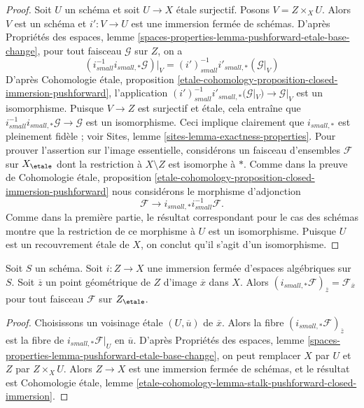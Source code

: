 \begin{proof}
Soit $U$ un schéma et soit $U \to X$ \'etale surjectif.
Posons $V = Z \times_X U$. Alors $V$ est un schéma et $i' : V \to U$ est
une immersion fermée de schémas. D'après
Propriétés des espaces,
lemme \ref{spaces-properties-lemma-pushforward-etale-base-change},
pour tout faisceau $\mathcal{G}$ sur $Z$, on a
$$
(i_{small}^{-1}i_{small, *}\mathcal{G})|_V =
(i')_{small}^{-1}i'_{small, *}(\mathcal{G}|_V)
$$
D'après
Cohomologie \'etale, proposition
\ref{etale-cohomology-proposition-closed-immersion-pushforward},
l'application
$(i')_{small}^{-1}i'_{small, *}(\mathcal{G}|_V) \to \mathcal{G}|_V$
est un isomorphisme. Puisque $V \to Z$ est surjectif et \'etale, cela entraîne
que $i_{small}^{-1}i_{small, *}\mathcal{G} \to \mathcal{G}$ est un
isomorphisme. Ceci implique clairement que $i_{small, *}$ est pleinement fidèle ; voir
Sites, lemme \ref{sites-lemma-exactness-properties}.
Pour prouver l'assertion sur l'image essentielle, considérons un faisceau d'ensembles
$\mathcal{F}$ sur $X_\etale$ dont la restriction à $X \setminus Z$ est
isomorphe à $*$. Comme dans la preuve de
Cohomologie \'etale, proposition
\ref{etale-cohomology-proposition-closed-immersion-pushforward}
nous considérons le morphisme d'adjonction
$$
\mathcal{F} \longrightarrow i_{small, *}i_{small}^{-1}\mathcal{F}.
$$
Comme dans la première partie, le résultat correspondant pour le cas des
schémas montre que la restriction de ce morphisme à $U$ est un isomorphisme.
Puisque $U$ est un recouvrement \'etale de $X$, on
conclut qu'il s'agit d'un isomorphisme.
\end{proof}

\begin{lemma}
\label{lemma-stalk-push-closed}
Soit $S$ un schéma. Soit $i : Z \to X$ une immersion fermée d'espaces
algébriques sur $S$. Soit $\overline{z}$ un point géométrique de $Z$
d'image $\overline{x}$ dans $X$. Alors
$(i_{small, *}\mathcal{F})_{\overline{z}} = \mathcal{F}_{\overline{x}}$
pour tout faisceau $\mathcal{F}$ sur $Z_\etale$.
\end{lemma}

\begin{proof}
Choisissons un voisinage \'etale $(U, \overline{u})$ de $\overline{x}$.
Alors la fibre $(i_{small, *}\mathcal{F})_{\overline{z}}$
est la fibre de $i_{small, *}\mathcal{F}|_U$ en $\overline{u}$.
D'après Propriétés des espaces,
lemme \ref{spaces-properties-lemma-pushforward-etale-base-change},
on peut remplacer $X$ par $U$ et $Z$ par $Z \times_X U$.
Alors $Z \to X$ est une immersion fermée de schémas, et le résultat est
Cohomologie \'etale, lemme
\ref{etale-cohomology-lemma-stalk-pushforward-closed-immersion}.
\end{proof}

